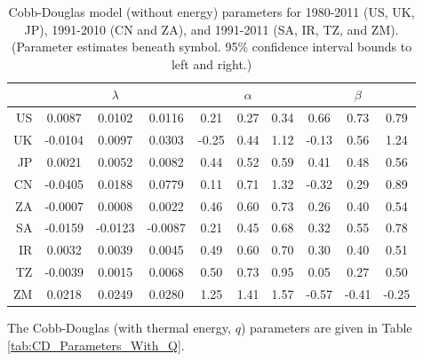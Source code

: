 \documentclass[preprint,authoryear,12pt]{elsarticle}\usepackage{graphicx, color}
\begin{document}
\begin{table}[H]
\begin{center}
\caption{Cobb-Douglas model (without energy) parameters for 1980-2011 (US, UK, JP), 1991-2010 (CN and ZA), and 1991-2011 (SA, IR, TZ, and ZM). (Parameter estimates beneath symbol. 95\% confidence interval bounds to left and right.)}
\label{tab:CD_Parameters_No_Energy}
{\tiny
\begin{tabular}{r|ccc|ccc|ccc}
  \hline
 &   & $\lambda$ &   &   & $\alpha$ &   &   & $\beta$ &   \\ 
  \hline
US & 0.0087 & 0.0102 & 0.0116 & 0.21 & 0.27 & 0.34 & 0.66 & 0.73 & 0.79 \\ 
  UK & -0.0104 & 0.0097 & 0.0303 & -0.25 & 0.44 & 1.12 & -0.13 & 0.56 & 1.24 \\ 
  JP & 0.0021 & 0.0052 & 0.0082 & 0.44 & 0.52 & 0.59 & 0.41 & 0.48 & 0.56 \\ 
  CN & -0.0405 & 0.0188 & 0.0779 & 0.11 & 0.71 & 1.32 & -0.32 & 0.29 & 0.89 \\ 
  ZA & -0.0007 & 0.0008 & 0.0022 & 0.46 & 0.60 & 0.73 & 0.26 & 0.40 & 0.54 \\ 
  SA & -0.0159 & -0.0123 & -0.0087 & 0.21 & 0.45 & 0.68 & 0.32 & 0.55 & 0.78 \\ 
  IR & 0.0032 & 0.0039 & 0.0045 & 0.49 & 0.60 & 0.70 & 0.30 & 0.40 & 0.51 \\ 
  TZ & -0.0039 & 0.0015 & 0.0068 & 0.50 & 0.73 & 0.95 & 0.05 & 0.27 & 0.50 \\ 
  ZM & 0.0218 & 0.0249 & 0.0280 & 1.25 & 1.41 & 1.57 & -0.57 & -0.41 & -0.25 \\ 
   \hline
\end{tabular}
}
\end{center}
\end{table}



The Cobb-Douglas (with thermal energy, $q$) parameters are given in Table \ref{tab:CD_Parameters_With_Q}.
\end{document}
